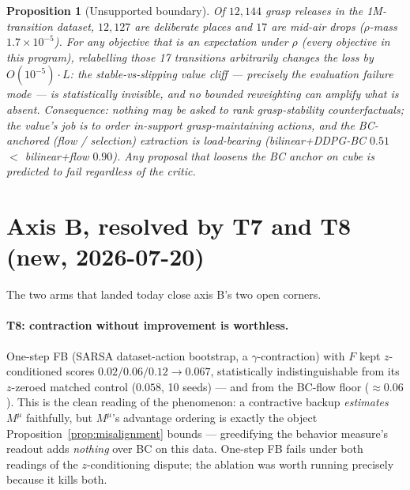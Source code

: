 \documentclass[11pt]{article}
\newtheorem{proposition}{Proposition}
\theoremstyle{definition}
\theoremstyle{remark}
\begin{document}
\begin{proposition}[Unsupported boundary]\label{prop:support}
Of $12{,}144$ grasp releases in the 1M-transition dataset, $12{,}127$ are deliberate places
and $17$ are mid-air drops ($\rho$-mass $1.7\times10^{-5}$). For any objective that is an
expectation under $\rho$ (every objective in this program), relabelling those 17 transitions
arbitrarily changes the loss by $O(10^{-5})\cdot L$: the stable-vs-slipping value cliff ---
precisely the evaluation failure mode --- is statistically invisible, and no bounded
reweighting can amplify what is absent. Consequence: nothing may be asked to \emph{rank
grasp-stability counterfactuals}; the value's job is to order \emph{in-support}
grasp-maintaining actions, and the BC-anchored (flow / selection) extraction is load-bearing
(bilinear+DDPG-BC $0.51$ $<$ bilinear+flow $0.90$). Any proposal that loosens the BC anchor
on cube is predicted to fail regardless of the critic.
\end{proposition}

\section{Axis B, resolved by T7 and T8 (new, 2026-07-20)}\label{sec:axisB}

The two arms that landed today close axis B's two open corners.

\paragraph{T8: contraction without improvement is worthless.} One-step FB (SARSA
dataset-action bootstrap, a $\gamma$-contraction) with $F$ kept $z$-conditioned scores
$0.02/0.06/0.12\to\mathbf{0.067}$, statistically indistinguishable from its $z$-zeroed
matched control ($0.058$, 10 seeds) --- and from the BC-flow floor ($\approx0.06$). This is
the clean reading of the phenomenon: a contractive backup \emph{estimates} $M^\mu$
faithfully, but $M^\mu$'s advantage ordering is exactly the object
Proposition~\ref{prop:misalignment} bounds --- greedifying the behavior measure's readout
adds \emph{nothing} over BC on this data. One-step FB fails under both readings of the
$z$-conditioning dispute; the ablation was worth running precisely because it kills both.
\end{document}
